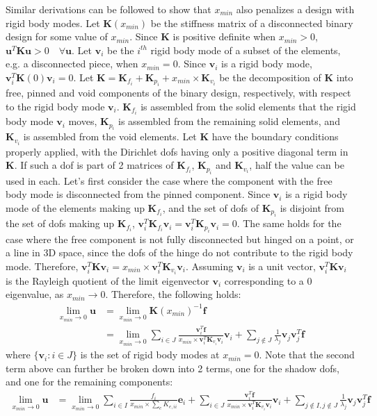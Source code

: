   Similar derivations can be followed to show that $x_{min}$ also penalizes a design with rigid body modes. Let $\bm{K}(x_{min})$ be the stiffness matrix of a disconnected binary design for some value of $x_{min}$. Since $\bm{K}$ is positive definite when $x_{min} > 0$, $\bm{u}^T \bm{K} \bm{u} > 0 \quad \forall \bm{u}$. Let $\bm{v}_i$ be the $i^{th}$ rigid body mode of a subset of the elements, e.g. a disconnected piece, when $x_{min} = 0$. Since $\bm{v}_i$ is a rigid body mode, $\bm{v}_i^T \bm{K}(0) \bm{v}_i = 0$. Let $\bm{K} = \bm{K}_{f_i} + \bm{K}_{p_i} + x_{min} \times \bm{K}_{v_i}$ be the decomposition of $\bm{K}$ into free, pinned and void components of the binary design, respectively, with respect to the rigid body mode $\bm{v}_i$. $\bm{K}_{f_i}$ is assembled from the solid elements that the rigid body mode $\bm{v}_i$ moves, $\bm{K}_{p_i}$ is assembled from the remaining solid elements, and $\bm{K}_{v_i}$ is assembled from the void elements. Let $\bm{K}$ have the boundary conditions properly applied, with the Dirichlet dofs having only a positive diagonal term in $\bm{K}$. If such a dof is part of 2 matrices of $\bm{K}_{f_i}$, $\bm{K}_{p_i}$ and $\bm{K}_{v_i}$, half the value can be used in each. Let's first consider the case where the component with the free body mode is disconnected from the pinned component. Since $\bm{v}_i$ is a rigid body mode of the elements making up $\bm{K}_{f_i}$, and the set of dofs of $\bm{K}_{p_i}$ is disjoint from the set of dofs making up $\bm{K}_{f_i}$, $\bm{v}_i^T \bm{K}_{f_i} \bm{v}_i = \bm{v}_i^T \bm{K}_{p_i} \bm{v}_i = 0$. The same holds for the case where the free component is not fully disconnected but hinged on a point, or a line in 3D space, since the dofs of the hinge do not contribute to the rigid body mode. Therefore, $\bm{v}_i^T \bm{K} \bm{v}_i = x_{min} \times \bm{v}_i^T \bm{K}_{v_i} \bm{v}_i$. Assuming $\bm{v}_i$ is a unit vector, $\bm{v}_i^T \bm{K} \bm{v}_i$ is the Rayleigh quotient of the limit eigenvector $\bm{v}_i$ corresponding to a 0 eigenvalue, as $x_{min} \to 0$. Therefore, the following holds:
  \begin{align}
    \lim_{x_{min} \to 0} \bm{u} & = \lim_{x_{min} \to 0} \bm{K}(x_{min})^{-1} \bm{f}\\
    & = \lim_{x_{min} \to 0} \sum_{i \in J} \frac{\bm{v}_i^T \bm{f}}{x_{min} \times \bm{v}_i^T \bm{K}_{v_i} \bm{v}_i} \bm{v}_i + \sum_{j \notin J} \frac{1}{\lambda_j} \bm{v}_j \bm{v}_j^T \bm{f}
  \end{align}
  where $\{\bm{v}_i: i \in J\}$ is the set of rigid body modes at $x_{min} = 0$. Note that the second term above can further be broken down into 2 terms, one for the shadow dofs, and one for the remaining components:
  \begin{align}
    \lim_{x_{min} \to 0} \bm{u} & = \lim_{x_{min} \to 0} \sum_{i \in I} \frac{f_i}{x_{min} \times \sum_e K_{e,ii}} \bm{e}_i + \sum_{i \in J} \frac{\bm{v}_i^T \bm{f}}{x_{min} \times \bm{v}_i^T \bm{K}_{v_i} \bm{v}_i} \bm{v}_i + \sum_{j \notin I, j \notin J} \frac{1}{\lambda_j} \bm{v}_j \bm{v}_j^T \bm{f}
  \end{align}

